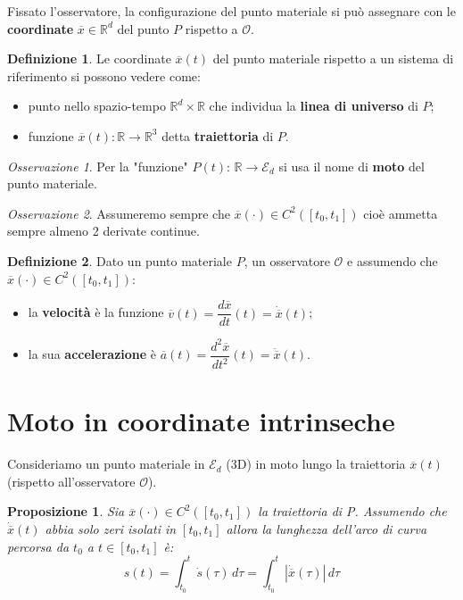 \documentclass{book}
\theoremstyle{plain}
\theoremstyle{plain}
\theoremstyle{plain}
\theoremstyle{plain}
\theoremstyle{plain}
\newtheorem{prop}{Proposizione}[chapter]
\theoremstyle{definition}
\newtheorem{defi}{Definizione}[chapter]
\theoremstyle{remark}
\newtheorem*{oss}{Osservazione}
\theoremstyle{definition}
\begin{document}
\noindent Fissato l'osservatore, la configurazione del punto materiale si può assegnare con le \textbf{coordinate} $\overline{x} \in \mathbb{R}^d$ del punto $P$ rispetto a $\mathcal{O}$.

\begin{defi}
	Le coordinate $\overline{x}(t)$ del punto materiale rispetto a un sistema di riferimento si possono vedere come:
	\begin{itemize}
	\item punto nello spazio-tempo $\mathbb{R}^d \times \mathbb{R}$ che individua la \textbf{linea di universo} di $P$;
	\item funzione $\overline{x}(t): \mathbb{R} \to \mathbb{R}^3$ detta \textbf{traiettoria} di $P$.
	\end{itemize}
\end{defi}

\begin{oss}
	Per la "funzione" $P(t)$: $\mathbb{R} \to \mathcal{E}_d$ si usa il nome di \textbf{moto} del punto materiale.
\end{oss}

\begin{oss}
    Assumeremo sempre che $\overline{x}(\cdot) \in C^2([t_0,t_1])$ cioè ammetta sempre almeno 2 derivate continue.
\end{oss}

\begin{defi}
    Dato un punto materiale $P$, un osservatore $\mathcal{O}$ e assumendo che $\overline{x}(\cdot) \in C^{2}\left([t_0, t_1]\right)$:
	\begin{itemize}
	\item la \textbf{velocità} è la funzione 	$\overline{v}(t)=\dfrac{d\overline{x}}{dt}(t)=\dot{\overline{x}}(t)$;
	\item la sua \textbf{accelerazione} è $\overline{a}(t)=\dfrac{d^2\overline{x}}{dt^2}(t)=\ddot{\overline{x}}(t)$.
	\end{itemize}
\end{defi}

\section{Moto in coordinate intrinseche}

Consideriamo un punto materiale in $\mathcal{E}_d$ (3D) in moto lungo la traiettoria $\overline{x}(t)$ (rispetto all'osservatore $\mathcal{O}$).

\begin{prop}
    Sia $\overline{x}(\cdot) \in C^{2} ([t_{0}, t_{1}])$ la traiettoria di P. Assumendo che $\dot{\overline{x}}(t)$ abbia solo zeri isolati in $[t_0, t_1]$ allora la lunghezza dell'arco di curva percorsa da $t_0$ a $t \in [t_0, t_1]$ è:
    \begin{displaymath}
    \boxed{
        s(t)=\int_{t_{0}}^{t} \dot{s}(\tau)\,d\tau = \int_{t_{0}}^{t}|\dot{\overline{x}}(\tau)|\,d\tau
        }
    \end{displaymath}
\end{prop}
\end{document}
